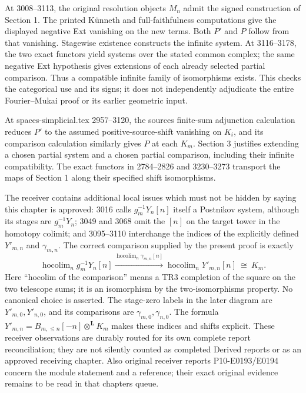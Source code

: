 At 3008–\allowbreak{}3113,\allowbreak{} the original resolution objects \(M_n\) admit the signed construction of Section 1. The printed Künneth and full-faithfulness computations give the displayed negative Ext vanishing on the new terms. Both \(P'\) and \(P\) follow from that vanishing. Stagewise existence constructs the infinite system. At 3116–\allowbreak{}3178,\allowbreak{} the two exact functors yield systems over the stated common complex; the same negative Ext hypothesis gives extensions of each already selected partial comparison. Thus a compatible infinite family of isomorphisms exists. This checks the categorical use and its signs; it does not independently adjudicate the entire Fourier–\allowbreak{}Mukai proof or its earlier geometric input.

At spaces-simplicial.tex 2957–\allowbreak{}3120,\allowbreak{} the source\textquotesingle s finite-sum adjunction calculation reduces \(P'\) to the assumed positive-source-shift vanishing on \(K_i\),\allowbreak{} and its comparison calculation similarly gives \(P\) at each \(K_m\). Section 3 justifies extending a chosen partial system and a chosen partial comparison,\allowbreak{} including their infinite compatibility. The exact functors in 2784–\allowbreak{}2826 and 3230–\allowbreak{}3273 transport the maps of Section 1 along their specified shift isomorphisms.

The receiver contains additional local issues which must not be hidden by saying this chapter is approved:\allowbreak{} 3016 calls \(g_m^{-1}Y_n[n]\) itself a Postnikov system,\allowbreak{} although its stages are \(g_m^{-1}Y_n\); 3049 and 3068 omit the \([n]\) on the target tower in the homotopy colimit; and 3095–\allowbreak{}3110 interchange the indices of the explicitly defined \(Y'_{m,n}\) and \(\gamma_{m,n}\). The correct comparison supplied by the present proof is exactly \[
\operatorname{hocolim}_n g_m^{-1}Y_n[n]
 \xrightarrow{\operatorname{hocolim}_n\gamma_{m,n}[n]}
\operatorname{hocolim}_n Y'_{m,n}[n]\ \cong\ K_m. \tag{7.1}
\] Here ``hocolim of the comparison'' means a TR3 completion of the square on the two telescope sums; it is an isomorphism by the two-isomorphisms property. No canonical choice is asserted. The stage-zero labels in the later diagram are \(Y'_{m,0},Y'_{n,0}\),\allowbreak{} and its comparisons are \(\gamma_{m,0},\gamma_{n,0}\). The formula \(Y'_{m,n}=B_{m,\leq n}[-n]\otimes^{\mathbf L}K_m\) makes these indices and shifts explicit. These receiver observations are durably routed for its own complete report reconciliation; they are not silently counted as completed Derived reports or as an approved receiving chapter. Also original receiver reports P10-E0193/\allowbreak{}E0194 concern the module statement and a reference; their exact original evidence remains to be read in that chapter\textquotesingle s queue.

